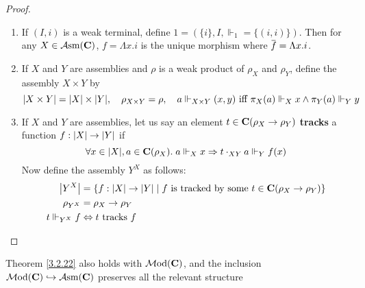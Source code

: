 \documentclass[11pt]{article}
\DeclareMathOperator{\Asm}{\mathcal{A}sm}
\DeclareMathOperator{\nMod}{\mathcal{M}od}
\begin{document}
\begin{proof}
\begin{enumerate}
\item If \((I,i)\) is a weak terminal, define \(1=(\{i\},I,\Vdash_1=\{(i,i)\})\). Then for any \(X\in\Asm(\bC)\),
\(f=\Lambda x.i\) is the unique morphism where \(\barf=\Lambda x.i\).
\setcounter{enumi}{1}
\item If \(X\) and \(Y\) are assemblies and \(\rho\) is a weak product of \(\rho_X\) and \(\rho_Y\), define
the assembly \(X\times Y\) by
\begin{equation*}
\abs{X\times Y}=\abs{X}\times\abs{Y},\quad\rho_{X\times Y}=\rho,\quad a\Vdash_{X\times Y}(x,y)\text{ iff }
\pi_X(a)\Vdash_Xx\wedge\pi_Y(a)\Vdash_Yy
\end{equation*}
\item If \(X\) and \(Y\) are assemblies, let us say an element \(t\in\operatorname{\textbf{C}}(\rho_X\to\rho_Y)\) \textbf{tracks} a
function \(f:\abs{X}\to\abs{Y}\) if
\begin{equation*}
\forall x\in\abs{X},a\in\bC(\rho_X).\;a\Vdash_Xx\Rightarrow t\cdot_{XY}a\Vdash_Yf(x)
\end{equation*}
Now define the assembly \(Y^X\) as follows:
\begin{align*}
\abs{Y^X}&=\{f:\abs{X}\to\abs{Y}\mid f\text{ is tracked by some }t\in\bC(\rho_X\to\rho_Y)\}\\
\rho_{Y^X}&=\rho_X\to\rho_Y\\
t\Vdash_{Y^X}f&\Leftrightarrow t\text{ tracks }f
\end{align*}
\end{enumerate}
\end{proof}

Theorem \ref{3.2.22} also holds with \(\nMod(\bC)\), and the
inclusion \(\nMod(\bC)\hookrightarrow\Asm(\bC)\) preserves all the relevant structure
\end{document}
